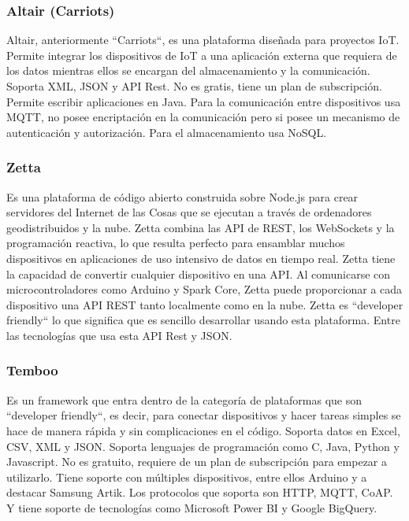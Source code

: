 {\subsubsection{Altair (Carriots)}

Altair, anteriormente ``Carriots``, es una plataforma diseñada para proyectos IoT. Permite integrar los dispositivos de IoT a una aplicación externa que requiera de los datos mientras ellos se encargan del almacenamiento y la comunicación. Soporta XML, JSON y API Rest. No es gratis, tiene un plan de subscripción. Permite escribir aplicaciones en Java. Para la comunicación entre dispositivos usa MQTT, no posee encriptación en la comunicación pero si posee un mecanismo de autenticación y autorización. Para el almacenamiento usa NoSQL. \cite{altair}

\subsubsection{Zetta}

Es una plataforma de código abierto construida sobre Node.js para crear servidores del Internet de las Cosas que se ejecutan a través de ordenadores geodistribuidos y la nube. Zetta combina las API de REST, los WebSockets y la programación reactiva, lo que resulta perfecto para ensamblar muchos dispositivos en aplicaciones de uso intensivo de datos en tiempo real. Zetta tiene la capacidad de convertir cualquier dispositivo en una API. Al comunicarse con microcontroladores como Arduino y Spark Core, Zetta puede proporcionar a cada dispositivo una API REST tanto localmente como en la nube. Zetta es ``developer friendly`` lo que significa que es sencillo desarrollar usando esta plataforma. Entre las tecnologías que usa esta API Rest y JSON. \cite{zetta}

\subsubsection{Temboo}

Es un framework que entra dentro de la categoría de plataformas que son ``developer friendly``, es decir, para conectar dispositivos y hacer tareas simples se hace de manera rápida y sin complicaciones en el código. Soporta datos en Excel, CSV, XML y JSON. Soporta lenguajes de programación como C, Java, Python y Javascript. No es gratuito, requiere de un plan de subscripción para empezar a utilizarlo. Tiene soporte con múltiples dispositivos, entre ellos Arduino y a destacar Samsung Artik. Los protocolos que soporta son HTTP, MQTT, CoAP. Y tiene soporte de tecnologías como Microsoft Power BI y Google BigQuery. \cite{temboo}

}
